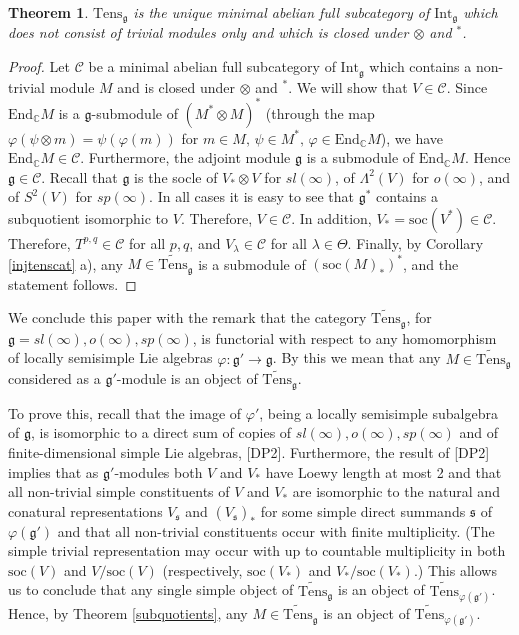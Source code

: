 \documentclass{birkmult}
\newcounter{theorem}
\newtheorem{theo}{Theorem}[section]
\newcommand {\CC} {\mathbb {C}}
\newcommand {\End} {\mathrm{End}}
\renewcommand{\gg}{\mathfrak{g}}
\renewcommand {\phi} {\varphi}
\newcommand{\refcor}[1]{Corollary \ref{#1}}
\newcommand{\Int}{\mathrm{Int}}
\newcommand{\tens}{\mathrm{Tens}}
\newcommand{\lind}{\widetilde{\mathrm{Tens}}}
\newcommand{\soc}{\mathrm{soc}}
\begin{document}
\begin{theo}\label{cardinality} $\tens_\gg$ is the unique minimal abelian full subcategory of $\Int_\gg$ which does not consist of trivial modules only and which is closed under $\otimes$ and $^*$.
\end{theo}
\begin{proof} Let $\mathcal C$ be a minimal abelian full subcategory of $\Int_\gg$ which contains a non-trivial module $M$ and is closed under $\otimes$ and $^*$.
We will show that $V\in\mathcal C$. Since $\End_{\CC}M$ is a
$\gg$-submodule of $(M^*\otimes  M)^*$ (through the map
$\phi(\psi\otimes m)=\psi(\phi(m))$ for $m\in M,\,\psi\in
M^*,\,\phi\in\End_\CC M$), we have $\End_{\CC}M\in\mathcal C$.
Furthermore, the adjoint module $\gg$ is a
  submodule of $\End_{\CC}M$. Hence $\gg\in\mathcal C$. Recall that
  $\gg$ is the socle of $V_*\otimes V$ for $sl(\infty)$, of $\Lambda^2(V)$
  for $o(\infty)$, and of $S^2(V)$ for $sp(\infty)$. In all cases it is
  easy to see that $\gg^*$ contains a subquotient isomorphic to $V$.
  Therefore, $V\in\mathcal C$. In addition, $V_*=\soc(V^*)\in\mathcal C$.
  Therefore, $T^{p,q}\in\mathcal C$ for all $p,q$, and $V_\lambda\in\mathcal
  C$ for all $\lambda\in\Theta$. Finally, by \refcor{injtenscat} a), any $M\in\lind_\gg$ is a
  submodule of $(\soc(M)_*)^*$, and the
  statement follows.
\end{proof}

We conclude this paper with the remark that the category
$\lind_\gg$, for $\gg=sl(\infty), o(\infty), sp(\infty)$, is
functorial with respect to any  homomorphism of locally semisimple
Lie algebras $\phi:\gg'\to\gg$. By this we mean that any
$M\in\lind_{\gg}$ considered as a 
$\gg'$-module is an object of
$\lind_{\gg}$.

To prove this, recall that the image of $\phi'$, being a locally
semisimple subalgebra of $\gg$, is isomorphic to a direct sum of
copies of $sl(\infty), o(\infty), sp(\infty)$ and of
finite-dimensional simple Lie algebras, [DP2]. Furthermore,
the result of [DP2] implies that as
$\gg'$-modules both $V$ and $V_*$ have Loewy length at most 2 and
that all non-trivial simple constituents of $V$ and $V_*$ are
isomorphic to the natural and conatural representations
$V_{\mathfrak  s}$ and $(V_{\mathfrak  s})_*$ for some simple
direct summands $\mathfrak s$ of $\phi(\gg')$ and that all non-trivial
constituents occur with
finite multiplicity. (The simple trivial representation may occur
with up to countable multiplicity in both $\soc(V)$ and
$V/\soc(V)$ (respectively, $\soc(V_*)$ and $V_*/\soc(V_*)$.)
This allows us to conclude that any single simple object of
$\lind_\gg$ is an object of $\lind_{\phi(\gg')}$. Hence, by Theorem \ref{subquotients},
any $M\in\lind_\gg$ is an object of $\lind_{\phi(\gg')}$.
\end{document}
